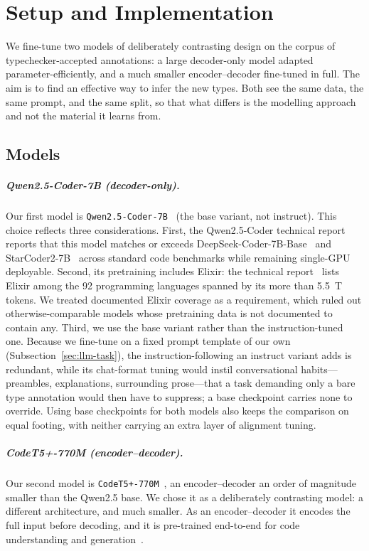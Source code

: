 \chapter{Setup and Implementation}
\label{ch:llm-settings}

We fine-tune two models of deliberately contrasting design on the corpus of typechecker-accepted annotations: a large decoder-only model adapted parameter-efficiently, and a much smaller encoder--decoder fine-tuned in full.
The aim is to find an effective way to infer the new types.
Both see the same data, the same prompt, and the same split, so that what differs is the modelling approach and not the material it learns from.

\section{Models}
\label{sec:llm-models}

\paragraph{Qwen2.5-Coder-7B (decoder-only).}
Our first model is \texttt{Qwen2.5-Coder-7B}~\cite{qwen25coder} (the base variant, not instruct).
This choice reflects three considerations.
First, the Qwen2.5-Coder technical report~\cite{qwen25coder} reports that this model matches or exceeds DeepSeek-Coder-7B-Base~\cite{deepseekcoder} and StarCoder2-7B~\cite{starcoder2} across standard code benchmarks while remaining single-GPU deployable.
Second, its pretraining includes Elixir: the technical report~\cite{qwen25coder} lists Elixir among the 92 programming languages spanned by its more than 5.5~T tokens.
We treated documented Elixir coverage as a requirement, which ruled out otherwise-comparable models whose pretraining data is not documented to contain any.
Third, we use the base variant rather than the instruction-tuned one.
Because we fine-tune on a fixed prompt template of our own (Subsection~\ref{sec:llm-task}), the instruction-following an instruct variant adds is redundant, while its chat-format tuning would instil conversational habits---preambles, explanations, surrounding prose---that a task demanding only a bare type annotation would then have to suppress; a base checkpoint carries none to override.
Using base checkpoints for both models also keeps the comparison on equal footing, with neither carrying an extra layer of alignment tuning.

\paragraph{CodeT5+-770M (encoder--decoder).}
Our second model is \texttt{CodeT5+-770M}~\cite{codet5p}, an encoder--decoder an order of magnitude smaller than the Qwen2.5 base.
We chose it as a deliberately contrasting model: a different architecture, and much smaller.
As an encoder--decoder it encodes the full input before decoding, and it is pre-trained end-to-end for code understanding and generation~\cite{codet5p}.


